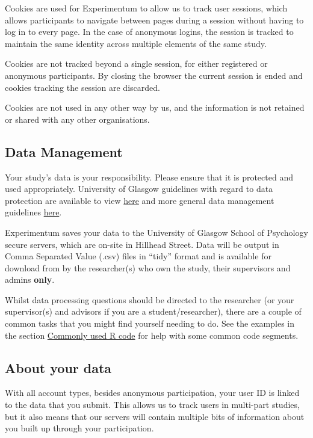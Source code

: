 \documentclass[]{book}
\begin{document}
Cookies are used for Experimentum to allow us to track user sessions,
which allows participants to navigate between pages during a session
without having to log in to every page. In the case of anonymous logins,
the session is tracked to maintain the same identity across multiple
elements of the same study.

Cookies are not tracked beyond a single session, for either registered
or anonymous participants. By closing the browser the current session is
ended and cookies tracking the session are discarded.

Cookies are not used in any other way by us, and the information is not
retained or shared with any other organisations.

\subsection*{Data Management}\label{data-management}

Your study's data is your responsibility. Please ensure that it is
protected and used appropriately. University of Glasgow guidelines with
regard to data protection are available to view
\href{https://www.gla.ac.uk/myglasgow/dpfoioffice/}{here} and more
general data management guidelines
\href{https://www.gla.ac.uk/myglasgow/datamanagement/rdmatglasgow/}{here}.

Experimentum saves your data to the University of Glasgow School of
Psychology secure servers, which are on-site in Hillhead Street. Data
will be output in Comma Separated Value (.csv) files in ``tidy'' format
and is available for download from by the researcher(s) who own the
study, their supervisors and admins \textbf{only}.

Whilst data processing questions should be directed to the researcher
(or your supervisor(s) and advisors if you are a student/researcher),
there are a couple of common tasks that you might find yourself needing
to do. See the examples in the section
\protect\hyperlink{commoncode}{Commonly used R code} for help with some
common code segments.

\subsection*{About your data}\label{about-your-data}

With all account types, besides anonymous participation, your user ID is
linked to the data that you submit. This allows us to track users in
multi-part studies, but it also means that our servers will contain
multiple bits of information about you built up through your
participation.
\end{document}
